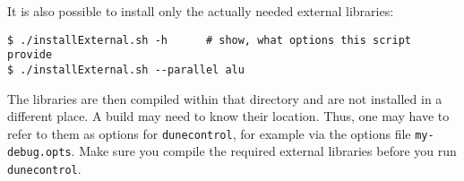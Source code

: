 It is also possible to install only the actually needed external libraries:
\begin{lstlisting}[style=Bash]
$ ./installExternal.sh -h      # show, what options this script provide
$ ./installExternal.sh --parallel alu
\end{lstlisting}

The libraries are then compiled within that directory and are not installed in a different place. 
A \Dune build may need to know their location. Thus, one may have to refer to them as options for \texttt{dunecontrol}, 
for example via the options file \texttt{my-debug.opts}. Make sure you compile the required external libraries before 
you run \texttt{dunecontrol}.
